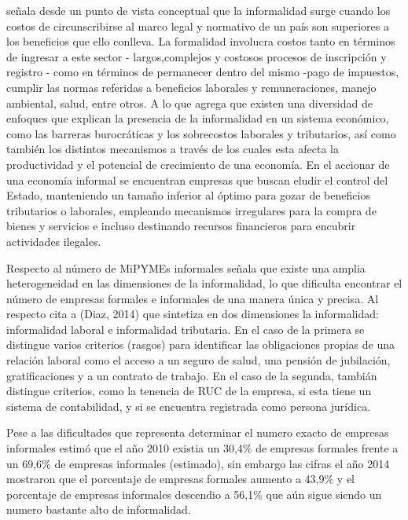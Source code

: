 \cite{loayza} señala desde un punto de vista conceptual que la informalidad surge
cuando los costos de circunscribirse al marco legal y normativo de un país son
superiores a los beneficios que ello conlleva. La formalidad involucra costos
tanto en términos de ingresar a este sector - largos,complejos y costosos procesos
de inscripción y registro - como en términos de permanecer dentro del mismo -pago
de impuestos, cumplir las normas referidas a beneficios laborales
y remuneraciones, manejo ambiental, salud, entre otros. A lo que \citep{penaranda}
agrega que existen una diversidad de enfoques que explican la presencia de la
informalidad en un sistema económico, como las barreras burocráticas y los sobrecostos
laborales y tributarios, así como también los distintos mecanismos a través de
los cuales esta afecta la productividad y el potencial de crecimiento de una
economía. En el accionar de una economía informal se encuentran empresas que
buscan eludir el control del Estado, manteniendo un tamaño inferior al óptimo
para gozar de beneficios tributarios o laborales, empleando mecanismos irregulares
para la compra de bienes y servicios e incluso destinando recursos financieros
para encubrir actividades ilegales.

Respecto al número de MiPYMEs informales \cite{produce2} señala que existe una
amplia heterogeneidad en las dimensiones de la informalidad, lo que dificulta
encontrar el número de empresas formales e informales de una manera única y precisa.
Al respecto \citep{produce2} cita a (Diaz, 2014) que sintetiza en dos dimensiones
la informalidad: informalidad laboral e informalidad tributaria. En el caso de la
primera se distingue varios criterios (rasgos) para identificar las obligaciones
propias de una relación laboral como el acceso a un seguro de salud, una pensión
de jubilación, gratificaciones y a un contrato de trabajo. En el caso de la segunda,
tambián distingue criterios, como la tenencia de RUC de la empresa, si esta tiene
un sistema de contabilidad, y si se encuentra registrada como persona jurídica.

Pese a las dificultades que representa determinar el numero exacto de empresas
informales \cite{produce2} estimó que el año 2010 existia un 30,4\% de empresas
formales frente a un 69,6\% de empresas informales (estimado), sin embargo las
cifras el año 2014 mostraron que el porcentaje de empresas formales aumento a 43,9\%
y el porcentaje de empresas informales descendio a 56,1\% que aún sigue siendo
un numero bastante alto de informalidad.

